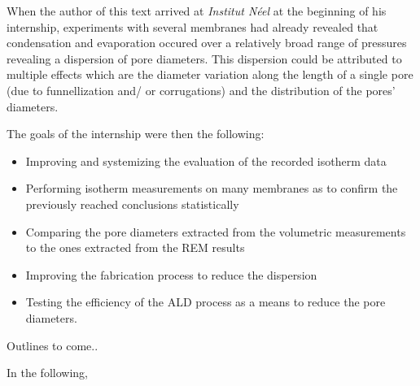 \documentclass[../thesis.tex]{subfiles}
\begin{document}
    When the author of this text arrived at \textit{Institut Néel} at the beginning of his internship, experiments with several membranes had already revealed that condensation and evaporation occured over a relatively broad range of pressures revealing a dispersion of pore diameters. This dispersion could be attributed to multiple effects which are the diameter variation along the length of a single pore (due to funnellization and/ or corrugations) and the distribution of the pores' diameters.
    \medskip

    The goals of the internship were then the following:
    \begin{itemize}
      \item Improving and systemizing the evaluation of the recorded isotherm data
      \item Performing isotherm measurements on many membranes as to confirm the previously reached conclusions statistically
      \item Comparing the pore diameters extracted from the volumetric measurements to the ones extracted from the REM results
      \item Improving the fabrication process to reduce the dispersion
      \item Testing the efficiency of the ALD process as a means to reduce the pore diameters.
    \end{itemize}

    \medskip

    Outlines to come..

    In the following,
\end{document}
